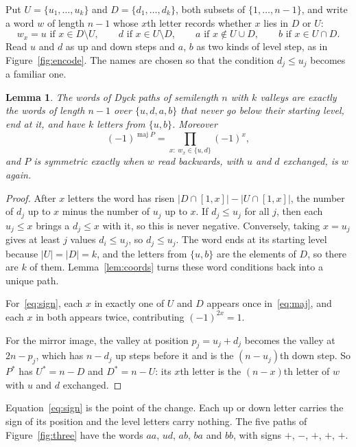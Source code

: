 \documentclass[11pt]{article}
\newtheorem{lemma}{Lemma}
\theoremstyle{remark}
\newcommand{\maj}{\operatorname{maj}}
\begin{document}
Put $U=\{u_1,\dots,u_k\}$ and $D=\{d_1,\dots,d_k\}$, both subsets of $\{1,\dots,n-1\}$, and write
a word $w$ of length $n-1$ whose $x$th letter records whether $x$ lies in $D$ or $U$:
\[
w_x=u \text{ if } x\in D\setminus U,\qquad d \text{ if } x\in U\setminus D,\qquad a \text{ if } x\notin U\cup D,
\qquad b \text{ if } x\in U\cap D .
\]
Read $u$ and $d$ as up and down steps and $a$, $b$ as two kinds of level step, as in
Figure~\ref{fig:encode}. The names are chosen so that the condition $d_j\le u_j$ becomes a familiar
one.

\begin{lemma}\label{lem:word}
The words of Dyck paths of semilength $n$ with $k$ valleys are exactly the words of length $n-1$
over $\{u,d,a,b\}$ that never go below their starting level, end at it, and have $k$ letters
from $\{u,b\}$. Moreover
\begin{equation}\label{eq:sign}
(-1)^{\maj P}=\prod_{x:\ w_x\in\{u,d\}}(-1)^x ,
\end{equation}
and $P$ is symmetric exactly when $w$ read backwards, with $u$ and $d$ exchanged, is $w$ again.
\end{lemma}

\begin{proof}
After $x$ letters the word has risen $|D\cap[1,x]|-|U\cap[1,x]|$, the number of $d_j$ up to $x$
minus the number of $u_j$ up to $x$. If $d_j\le u_j$ for all $j$, then each $u_j\le x$ brings a
$d_j\le x$ with it, so this is never negative. Conversely, taking $x=u_j$ gives at least $j$
values $d_i\le u_j$, so $d_j\le u_j$. The word ends at its starting level because $|U|=|D|=k$,
and the letters from $\{u,b\}$ are the elements of $D$, so there are $k$ of them.
Lemma~\ref{lem:coords} turns these word conditions back into a unique path.

For~\eqref{eq:sign}, each $x$ in exactly one of $U$ and $D$ appears once in~\eqref{eq:maj}, and
each $x$ in both appears twice, contributing $(-1)^{2x}=1$.

For the mirror image, the valley at position $p_j=u_j+d_j$ becomes the valley at $2n-p_j$, which
has $n-d_j$ up steps before it and is the $(n-u_j)$th down step. So $P^*$ has $U^*=n-D$ and $D^*=n-U$:
its $x$th letter is the $(n-x)$th letter of $w$ with $u$ and $d$ exchanged.
\end{proof}

Equation~\eqref{eq:sign} is the point of the change. Each up or down letter carries the sign of
its position and the level letters carry nothing. The five paths of Figure~\ref{fig:three} have
the words $aa$, $ud$, $ab$, $ba$ and $bb$, with signs $+$, $-$, $+$, $+$, $+$.
\end{document}
